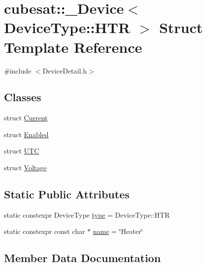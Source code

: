 \hypertarget{structcubesat_1_1__Device_3_01DeviceType_1_1HTR_01_4}{}\section{cubesat\+:\+:\+\_\+\+Device$<$ Device\+Type\+:\+:H\+TR $>$ Struct Template Reference}
\label{structcubesat_1_1__Device_3_01DeviceType_1_1HTR_01_4}


{\ttfamily \#include $<$Device\+Detail.\+h$>$}

\subsection*{Classes}
\begin{DoxyCompactItemize}
\item 
struct \hyperlink{structcubesat_1_1__Device_3_01DeviceType_1_1HTR_01_4_1_1Current}{Current}
\item 
struct \hyperlink{structcubesat_1_1__Device_3_01DeviceType_1_1HTR_01_4_1_1Enabled}{Enabled}
\item 
struct \hyperlink{structcubesat_1_1__Device_3_01DeviceType_1_1HTR_01_4_1_1UTC}{U\+TC}
\item 
struct \hyperlink{structcubesat_1_1__Device_3_01DeviceType_1_1HTR_01_4_1_1Voltage}{Voltage}
\end{DoxyCompactItemize}
\subsection*{Static Public Attributes}
\begin{DoxyCompactItemize}
\item 
static constexpr Device\+Type \hyperlink{structcubesat_1_1__Device_3_01DeviceType_1_1HTR_01_4_a229515b71efb58bc4a80d1dc2094eb64}{type} = Device\+Type\+::\+H\+TR
\item 
static constexpr const char $\ast$ \hyperlink{structcubesat_1_1__Device_3_01DeviceType_1_1HTR_01_4_a0d57e1e4eed4626abbaca9964c7c5d10}{name} = \char`\"{}Heater\char`\"{}
\end{DoxyCompactItemize}


\subsection{Member Data Documentation}
\mbox{\label{structcubesat_1_1__Device_3_01DeviceType_1_1HTR_01_4_a0d57e1e4eed4626abbaca9964c7c5d10}} 
